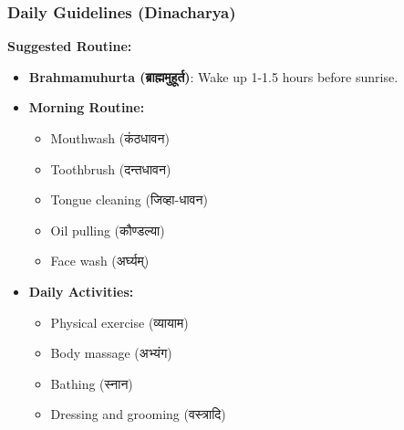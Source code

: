 \begin{frame}[fragile]\frametitle{Daily Guidelines (Dinacharya)}
    \textbf{Suggested Routine:}
    \begin{itemize}
        \item \textbf{Brahmamuhurta (ब्राह्ममुहूर्त)}: Wake up 1-1.5 hours before sunrise.
        \item \textbf{Morning Routine:}
        \begin{itemize}
            \item Mouthwash (कंठधावन)
            \item Toothbrush (दन्तधावन)
            \item Tongue cleaning (जिव्हा-धावन)
            \item Oil pulling (कौण्डल्या)
            \item Face wash (अर्घ्यम्)
        \end{itemize}
        \item \textbf{Daily Activities:}
        \begin{itemize}
            \item Physical exercise (व्यायाम)
            \item Body massage (अभ्यंग)
            \item Bathing (स्नान)
            \item Dressing and grooming (वस्त्रादि)
        \end{itemize}
    \end{itemize}
\end{frame}

